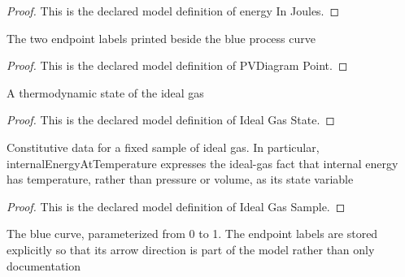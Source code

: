 \begin{proof}
  This is the declared model definition of energy In Joules.
\end{proof}
\begin{definition}
  \label{def:physics:phyx-mini-0339:phyxminiproblems-problemphyxmini0339-pvdiagrampoint}
  The two endpoint labels printed beside the blue process curve
\end{definition}
\begin{proof}
  This is the declared model definition of PVDiagram Point.
\end{proof}
\begin{definition}
  \label{def:physics:phyx-mini-0339:phyxminiproblems-problemphyxmini0339-idealgasstate}
  A thermodynamic state of the ideal gas
\end{definition}
\begin{proof}
  This is the declared model definition of Ideal Gas State.
\end{proof}
\begin{definition}
  \label{def:physics:phyx-mini-0339:phyxminiproblems-problemphyxmini0339-idealgassample}
  Constitutive data for a fixed sample of ideal gas. In particular, internalEnergyAtTemperature expresses the ideal-gas fact that internal energy has temperature, rather than pressure or volume, as its state variable
\end{definition}
\begin{proof}
  This is the declared model definition of Ideal Gas Sample.
\end{proof}
\begin{definition}
  \label{def:physics:phyx-mini-0339:phyxminiproblems-problemphyxmini0339-idealgaspvprocess}
  The blue curve, parameterized from 0 to 1. The endpoint labels are stored explicitly so that its arrow direction is part of the model rather than only documentation
\end{definition}
